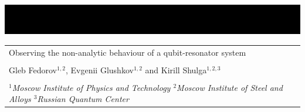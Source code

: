 \documentclass[a0, portrait]{a0poster}
\begin{document}
\begin{center}
\vspace*{-2cm}
\hspace*{-2cm}\includegraphics[width=1.2\textwidth]{Black_Landscape}
\end{center}


\begin{minipage}{0.65\textwidth}					
\vspace{-11cm}
\begin{tabular}[t]{l}
{\color{headingcol}\fontsize{68}{70}\selectfont Observing the non-analytic behaviour of a qubit-resonator system}\\
\\
{\hspace{1cm} \color{white}\Large Gleb Fedorov$^{1,2}$, Evgenii Glushkov$^{1,2}$ and Kirill Shulga$^{1,2,3}$}\\
\\
{\hspace{1.2cm}\color{white}\large $^1$\textit{Moscow Institute of Physics and Technology \hspace{1cm} $^2$Moscow Institute of Steel and Alloys \hspace{1cm} $^3$Russian Quantum Center}}
\end{tabular}
\end{minipage}
\hspace{19cm}
\end{document}
